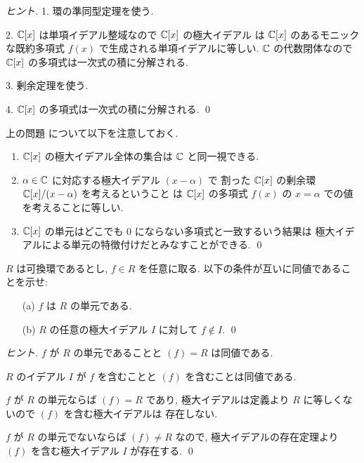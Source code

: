 \documentclass[12pt,twoside]{jarticle}
\begin{document}
\begin{proof}[ヒント]
 1. 環の準同型定理を使う. 

 2. ${\mathbb C}[x]$ は単項イデアル整域なので ${\mathbb C}[x]$ の極大イデアル
 は ${\mathbb C}[x]$ のあるモニックな既約多項式 $f(x)$ で生成される単項イデアルに等しい.
 ${\mathbb C}$ の代数閉体なので ${\mathbb C}[x]$ の多項式は一次式の積に分解される.

 3. 剰余定理を使う.

 4. ${\mathbb C}[x]$ の多項式は一次式の積に分解される.
 \qed
\end{proof}

\begin{rem}
 上の問題  
 について以下を注意しておく.
 \begin{enumerate}
 \item ${\mathbb C}[x]$ の極大イデアル全体の集合は ${\mathbb C}$ と同一視できる.
 \item $\alpha\in{\mathbb C}$ に対応する極大イデアル $(x-\alpha)$ で
  割った ${\mathbb C}[x]$ の剰余環 ${\mathbb C}[x]/(x-\alpha)$ を考えるということ
  は ${\mathbb C}[x]$ の多項式 $f(x)$ の $x=\alpha$ での値を考えることに等しい.
 \item ${\mathbb C}[x]$ の単元はどこでも $0$ にならない多項式と一致するいう結果は
  極大イデアルによる単元の特徴付けだとみなすことができる.
  \qed
 \end{enumerate}
\end{rem}

\begin{question}[極大イデアルによる単元の特徴付け]
 $R$ は可換環であるとし, $f\in R$ を任意に取る.
 以下の条件が互いに同値であることを示せ:
 \begin{enumerate}
  \item[(a)] $f$ は $R$ の単元である.
  \item[(b)] $R$ の任意の極大イデアル $I$ に対して $f\not\in I$.
  \qed
 \end{enumerate}
\end{question}

\begin{proof}[ヒント]
 $f$ が $R$ の単元であることと $(f)=R$ は同値である.

 $R$ のイデアル $I$ が $f$ を含むことと $(f)$ を含むことは同値である.

 $f$ が $R$ の単元ならば $(f)=R$ であり, 
 極大イデアルは定義より $R$ に等しくないので $(f)$ を含む極大イデアルは
 存在しない.

 $f$ が $R$ の単元でないならば $(f)\ne R$ なので, 
 極大イデアルの存在定理より $(f)$ を含む極大イデアル $I$ が存在する.
 \qed
\end{proof}
\end{document}
